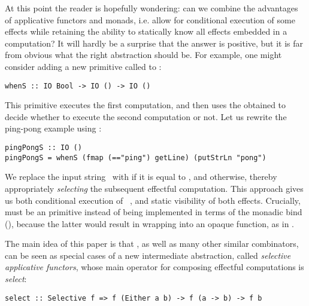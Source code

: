 At this point the reader is hopefully wondering: can we combine the advantages
of applicative functors and monads, i.e. allow for conditional execution of some
effects while retaining the ability to statically know all effects embedded in
a computation? It will hardly be a surprise that the answer is positive, but it
is far from obvious what the right abstraction should be. For example, one might
consider adding a new primitive called  to :

\vspace{0.5mm}
\begin{verbatim}
whenS :: IO Bool -> IO () -> IO ()
\end{verbatim}
\vspace{0.5mm}

\noindent
This primitive executes the first computation, and then uses the obtained
 to decide whether to execute the second computation or not. Let us
rewrite the ping-pong example using :

\vspace{0.5mm}
\begin{verbatim}
pingPongS :: IO ()
pingPongS = whenS (fmap (=="ping") getLine) (putStrLn "pong")
\end{verbatim}
\vspace{0.5mm}

\noindent
We replace the input string~ with  if it is equal to ,
and  otherwise, thereby appropriately \emph{selecting} the subsequent
effectful computation. This approach gives us both conditional execution of
~, and static visibility of both effects. Crucially,
 must be an  primitive instead of being implemented in terms of
the monadic bind (\hs{>>=}), because the latter would result in wrapping
 into an opaque function, as in .

The main idea of this paper is that , as well as many other similar
combinators, can be seen as special cases of a new intermediate abstraction,
called \emph{selective applicative functors}, whose main operator for composing
effectful computations is \emph{select}:

\vspace{0.5mm}
\begin{verbatim}
select :: Selective f => f (Either a b) -> f (a -> b) -> f b
\end{verbatim}
\vspace{0.5mm}

